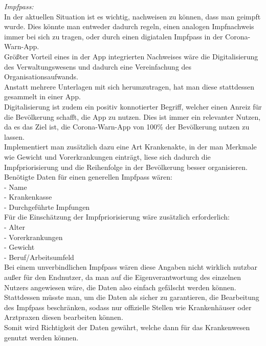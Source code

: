 \documentclass[conference]{IEEEtran}
\begin{document}
\textit{Impfpass:} \\ 
In der aktuellen Situation ist es wichtig, nachweisen zu können, dass man geimpft wurde. Dies könnte man entweder dadurch regeln, einen analogen Impfnachweis immer bei sich zu tragen, oder durch einen digiatalen Impfpass in der Corona-Warn-App.\\
Größter Vorteil eines in der App integrierten Nachweises wäre die Digitalisierung des Verwaltungswesens und dadurch eine Vereinfachung des Organisationsaufwands.\\ Anstatt mehrere Unterlagen mit sich herumzutragen, hat man diese stattdessen gesammelt in einer App.\\
Digitalisierung ist zudem ein positiv konnotierter Begriff, welcher einen Anreiz für die Bevölkerung schafft, die App zu nutzen. Dies ist immer ein relevanter Nutzen, da es das Ziel ist, die Corona-Warn-App von 100\% der Bevölkerung nutzen zu lassen. \\
Implementiert man zusätzlich dazu eine Art Krankenakte, in der man Merkmale wie Gewicht und Vorerkrankungen einträgt, liese sich dadurch die Impfpriorisierung und die Reihenfolge in der Bevölkerung besser organisieren.\\
Benötigte Daten für einen generellen Impfpass wären:\\
- Name \\
- Krankenkasse\\
- Durchgeführte Impfungen\\
Für die Einschätzung der Impfpriorisierung wäre zusätzlich erforderlich:\\
- Alter\\
- Vorerkrankungen \\
- Gewicht \\
- Beruf/Arbeitsumfeld\\
Bei einem unverbindlichen Impfpass wären diese Angaben nicht wirklich nutzbar außer für den Endnutzer, da man auf die Eigenverantwortung des einzelnen Nutzers angewiesen wäre, die Daten also einfach gefälscht werden können.\\
Stattdessen müsste man, um die Daten als sicher zu garantieren, die Bearbeitung des Impfpass beschränken, sodass nur offizielle Stellen wie Krankenhäuser oder Arztpraxen diesen bearbeiten können.\\
Somit wird Richtigkeit der Daten gewährt, welche dann für das Krankenwesen genutzt werden können.\\
\end{document}
